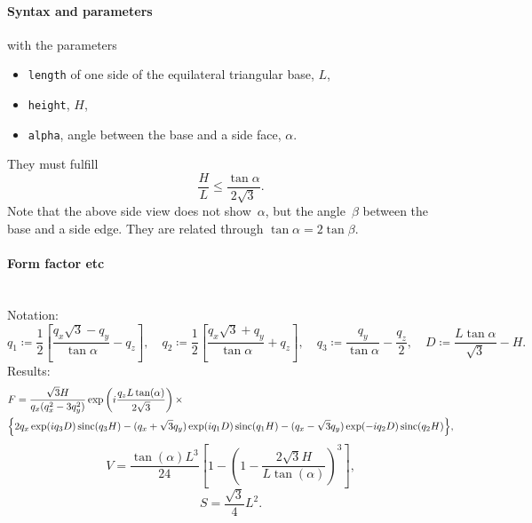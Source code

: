 \paragraph{Syntax and parameters}
\begin{quote}
\end{quote}
with the parameters
\begin{itemize}
\item \texttt{length} of one side of the equilateral triangular base, $L$,
\item \texttt{height}, $H$,
\item \texttt{alpha}, angle between the base and a side face, $\alpha$.
\end{itemize}
They must fulfill
\begin{displaymath}
\dfrac{H}{L}\le \dfrac{\tan{\alpha}}{2\sqrt{3}}.
\end{displaymath}
Note that the above side view does not show~$\alpha$,
but the angle~$\beta$ between the base and a side edge.
They are related through $\tan \alpha = 2 \tan \beta$. 


\paragraph{Form factor etc}\strut\\
Notation:
\begin{equation*}
q_1  \coloneqq \frac{1}{2}\left[\frac{q_x\sqrt{3} -q_y}{\tan \alpha}-q_z \right],
\quad q_2 \coloneqq \frac{1}{2}\left[\frac{q_x\sqrt{3} +q_y}{\tan \alpha}+q_z
\right], \quad 
q_3 \coloneqq \frac{q_y}{\tan \alpha} -\frac{q_z}{2}, \quad 
D \coloneqq \frac{L \tan \alpha}{\sqrt{3}} -H.
\end{equation*}
Results:
\begin{align*}
&F=\frac{\sqrt{3}H}{q_x (q_x^2-3q_y^2)}
\exp\left(i\frac{q_z L\tan (\alpha)}{2\sqrt{3}}\right) \times \\
&\Big\{2q_x \exp(iq_3 D)\operatorname{sinc}(q_3 H) - (q_x +\sqrt{3}q_y)
\exp(iq_1 D)\operatorname{sinc}(q_1 H) -(q_x-\sqrt{3}q_y)\exp(-iq_2
D)\operatorname{sinc}(q_2 H) \Big\}, 
\end{align*}
\begin{equation*}
  V= \dfrac{\tan(\alpha) L^3}{24} \left[1- \left(1 -
  \dfrac{2\sqrt{3} H}{L \tan(\alpha)} \right)^3\right],
\end{equation*}
\begin{equation*}
  S =\dfrac{\sqrt{3}}{4}L^2.
\end{equation*}

